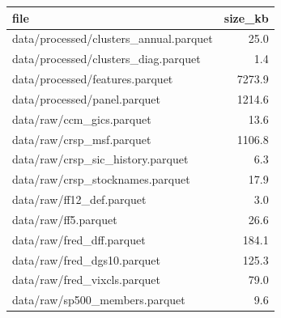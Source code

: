 \documentclass[
  letterpaper,
  DIV=11,
  numbers=noendperiod]{scrartcl}
\newcounter{none} %
\begin{document}
{\def\LTcaptype{none} %
\begin{longtable}[]{@{}lr@{}}
\toprule\noalign{}
file & size\_kb \\
\midrule\noalign{}
\endhead
\bottomrule\noalign{}
\endlastfoot
data/processed/clusters\_annual.parquet & 25.0 \\
data/processed/clusters\_diag.parquet & 1.4 \\
data/processed/features.parquet & 7273.9 \\
data/processed/panel.parquet & 1214.6 \\
data/raw/ccm\_gics.parquet & 13.6 \\
data/raw/crsp\_msf.parquet & 1106.8 \\
data/raw/crsp\_sic\_history.parquet & 6.3 \\
data/raw/crsp\_stocknames.parquet & 17.9 \\
data/raw/ff12\_def.parquet & 3.0 \\
data/raw/ff5.parquet & 26.6 \\
data/raw/fred\_dff.parquet & 184.1 \\
data/raw/fred\_dgs10.parquet & 125.3 \\
data/raw/fred\_vixcls.parquet & 79.0 \\
data/raw/sp500\_members.parquet & 9.6 \\
\end{longtable}
}
\end{document}
